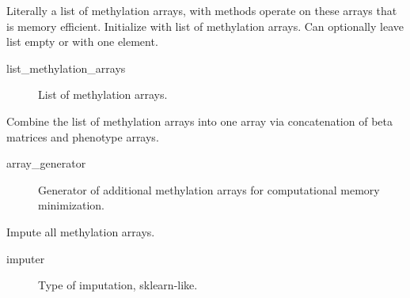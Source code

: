 \documentclass[letterpaper,10pt,english]{sphinxmanual}
\begin{document}
\begin{fulllineitems}
\label{\detokenize{index:pymethylprocess.MethylationDataTypes.MethylationArrays}}
Literally a list of methylation arrays, with methods operate on these arrays that is memory efficient.
Initialize with list of methylation arrays. Can optionally leave list empty or with one element.
\begin{description}
\item[{list\_methylation\_arrays}] \leavevmode
List of methylation arrays.

\end{description}

\begin{fulllineitems}
\label{\detokenize{index:pymethylprocess.MethylationDataTypes.MethylationArrays.combine}}
Combine the list of methylation arrays into one array via concatenation of beta matrices and phenotype arrays.
\begin{description}
\item[{array\_generator}] \leavevmode
Generator of additional methylation arrays for computational memory minimization.

\end{description}

\end{fulllineitems}


\begin{fulllineitems}
\label{\detokenize{index:pymethylprocess.MethylationDataTypes.MethylationArrays.impute}}
Impute all methylation arrays.
\begin{description}
\item[{imputer}] \leavevmode
Type of imputation, sklearn-like.

\end{description}


\end{fulllineitems}
\end{fulllineitems}
\end{document}
